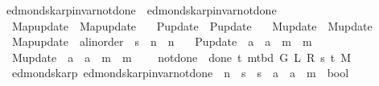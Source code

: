 \begin{isabellebody}
\endisatagproof
{\isafoldproof}%
%
\isadelimproof
\isanewline
%
\endisadelimproof
\isanewline
{}\isamarkupfalse%
\ edmonds{\isacharunderscore}{\kern0pt}karp{\isacharunderscore}{\kern0pt}invar{\isacharunderscore}{\kern0pt}not{\isacharunderscore}{\kern0pt}done{\isacharunderscore}{\kern0pt}{}\ {\isacharequal}{\kern0pt}\ edmonds{\isacharunderscore}{\kern0pt}karp{\isacharunderscore}{\kern0pt}invar{\isacharunderscore}{\kern0pt}not{\isacharunderscore}{\kern0pt}done{\isacharunderscore}{\kern0pt}{}\ \isanewline
\ \ Map{\isacharunderscore}{\kern0pt}update\ {\isacharequal}{\kern0pt}\ Map{\isacharunderscore}{\kern0pt}update\ \isanewline
\ \ P{\isacharunderscore}{\kern0pt}update\ {\isacharequal}{\kern0pt}\ P{\isacharunderscore}{\kern0pt}update\ \isanewline
\ \ M{\isacharunderscore}{\kern0pt}update\ {\isacharequal}{\kern0pt}\ M{\isacharunderscore}{\kern0pt}update\ \isanewline
\ \ Map{\isacharunderscore}{\kern0pt}update\ {\isacharcolon}{\kern0pt}{\isacharcolon}{\kern0pt}\ {\isachardoublequoteopen}{\isacharprime}{\kern0pt}a{\isacharcolon}{\kern0pt}{\isacharcolon}{\kern0pt}linorder\ {\isasymRightarrow}\ {\isacharprime}{\kern0pt}s\ {\isasymRightarrow}\ {\isacharprime}{\kern0pt}n\ {\isasymRightarrow}\ {\isacharprime}{\kern0pt}n{\isachardoublequoteclose}\ \isanewline
\ \ P{\isacharunderscore}{\kern0pt}update\ {\isacharcolon}{\kern0pt}{\isacharcolon}{\kern0pt}\ {\isachardoublequoteopen}{\isacharprime}{\kern0pt}a\ {\isasymRightarrow}\ {\isacharprime}{\kern0pt}a\ {\isasymRightarrow}\ {\isacharprime}{\kern0pt}m\ {\isasymRightarrow}\ {\isacharprime}{\kern0pt}m{\isachardoublequoteclose}\ \isanewline
\ \ M{\isacharunderscore}{\kern0pt}update\ {\isacharcolon}{\kern0pt}{\isacharcolon}{\kern0pt}\ {\isachardoublequoteopen}{\isacharprime}{\kern0pt}a\ {\isasymRightarrow}\ {\isacharprime}{\kern0pt}a\ {\isasymRightarrow}\ {\isacharprime}{\kern0pt}m\ {\isasymRightarrow}\ {\isacharprime}{\kern0pt}m{\isachardoublequoteclose}\ {\isacharplus}{\kern0pt}\isanewline
\ \ \ not{\isacharunderscore}{\kern0pt}done{\isacharunderscore}{\kern0pt}{}{\isacharcolon}{\kern0pt}\ {\isachardoublequoteopen}{\isasymnot}\ done{\isacharunderscore}{\kern0pt}{}\ t\ {\isacharparenleft}{\kern0pt}m{\isacharunderscore}{\kern0pt}tbd\ G\ L\ R\ s\ t\ M{\isacharparenright}{\kern0pt}{\isachardoublequoteclose}\isanewline
%
\isadeliminvisible
\isanewline
%
\endisadeliminvisible
%
\isataginvisible
{}\isamarkupfalse%
\ {\isacharparenleft}{\kern0pt}\ edmonds{\isacharunderscore}{\kern0pt}karp{\isacharparenright}{\kern0pt}\ edmonds{\isacharunderscore}{\kern0pt}karp{\isacharunderscore}{\kern0pt}invar{\isacharunderscore}{\kern0pt}not{\isacharunderscore}{\kern0pt}done{\isacharunderscore}{\kern0pt}{}{\isacharprime}{\kern0pt}\ {\isacharcolon}{\kern0pt}{\isacharcolon}{\kern0pt}\ {\isachardoublequoteopen}{\isacharprime}{\kern0pt}n\ {\isasymRightarrow}\ {\isacharprime}{\kern0pt}s\ {\isasymRightarrow}\ {\isacharprime}{\kern0pt}s\ {\isasymRightarrow}\ {\isacharprime}{\kern0pt}a\ {\isasymRightarrow}\ {\isacharprime}{\kern0pt}a\ {\isasymRightarrow}\ {\isacharprime}{\kern0pt}m\ {\isasymRightarrow}\ bool{\isachardoublequoteclose}\ \isanewline

\end{isabellebody}
